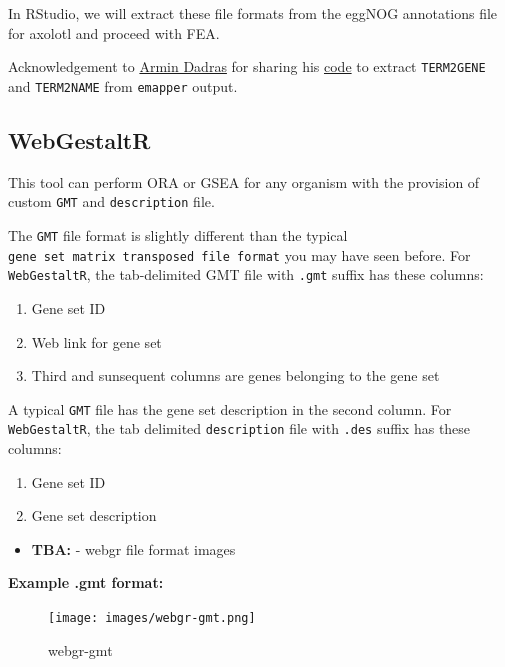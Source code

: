 \documentclass[
]{book}
\providecommand{\tightlist}{%
  \setlength{\itemsep}{0pt}\setlength{\parskip}{0pt}}
\begin{document}
In RStudio, we will extract these file formats from the eggNOG annotations file for axolotl and proceed with FEA.

Acknowledgement to \href{https://github.com/dadrasarmin}{Armin Dadras} for sharing his \href{https://github.com/dadrasarmin/enrichment_analysis_for_non_model_organism\%5D}{code} to extract \texttt{TERM2GENE} and \texttt{TERM2NAME} from \texttt{emapper} output.

\hypertarget{webgestaltr-1}{%
\subsection{WebGestaltR}\label{webgestaltr-1}}

This tool can perform ORA or GSEA for any organism with the provision of custom \texttt{GMT} and \texttt{description} file.

The \texttt{GMT} file format is slightly different than the typical \texttt{gene\ set\ matrix\ transposed\ file\ format} you may have seen before. For \texttt{WebGestaltR}, the tab-delimited GMT file with \texttt{.gmt} suffix has these columns:

\begin{enumerate}
\def\labelenumi{\arabic{enumi}.}
\tightlist
\item
  Gene set ID
\item
  Web link for gene set
\item
  Third and sunsequent columns are genes belonging to the gene set
\end{enumerate}

A typical \texttt{GMT} file has the gene set description in the second column. For \texttt{WebGestaltR}, the tab delimited \texttt{description} file with \texttt{.des} suffix has these columns:

\begin{enumerate}
\def\labelenumi{\arabic{enumi}.}
\tightlist
\item
  Gene set ID
\item
  Gene set description
\end{enumerate}

\begin{itemize}
\tightlist
\item
  \textbf{TBA:} - webgr file format images
\end{itemize}

\textbf{Example .gmt format:}

\begin{figure}
\centering
\texttt{[image: images/webgr-gmt.png]}
\caption{webgr-gmt}
\end{figure}
\end{document}
